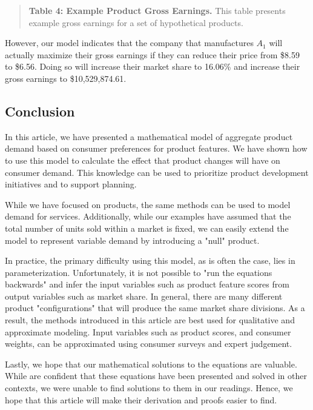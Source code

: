 \documentclass[]{article}
\begin{document}
\begin{quote}
\textbf{Table 4: Example Product Gross Earnings.} This table presents
example gross earnings for a set of hypothetical products.
\end{quote}

However, our model indicates that the company that manufactures \(A_1\)
will actually maximize their gross earnings if they can reduce their
price from \$8.59 to \$6.56. Doing so will increase their market share to 16.06\% and increase their
gross earnings to \$10,529,874.61.

\hypertarget{conclusion}{%
\subsection{Conclusion}\label{conclusion}}

In this article, we have presented a mathematical model of aggregate
product demand based on consumer preferences for product features. We
have shown how to use this model to calculate the effect that product
changes will have on consumer demand. This knowledge can be used to
prioritize product development initiatives and to support planning.

While we have focused on products, the same methods can be used to model
demand for services. Additionally, while our examples have assumed that
the total number of units sold within a market is fixed, we can easily
extend the model to represent variable demand by introducing a "null"
product.

In practice, the primary difficulty using this model, as is often the
case, lies in parameterization. Unfortunately, it is not possible to
"run the equations backwards" and infer the input variables such as
product feature scores from output variables such as market share. In
general, there are many different product "configurations" that will
produce the same market share divisions. As a result, the methods
introduced in this article are best used for qualitative and approximate
modeling. Input variables such as product scores, and consumer weights,
can be approximated using consumer surveys and expert judgement.

Lastly, we hope that our mathematical solutions to the equations are valuable.
While are confident that these equations have been presented and solved
in other contexts, we were unable to find solutions to them in our
readings. Hence, we hope that this article will make their derivation
and proofs easier to find.
\end{document}
